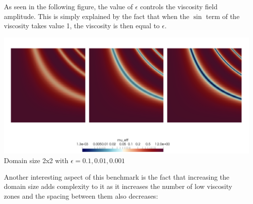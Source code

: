 As seen in the following figure, the value of $\epsilon$ controls the viscosity field amplitude.
This is simply explained by the fact that when the $\sin$ term of the viscosity takes value 1, the viscosity
is then equal to $\epsilon$.
\begin{center}
\includegraphics[width=14cm]{images/mms/mms7_mueffs}\\
Domain size 2x2 with $\epsilon=0.1, 0.01, 0.001$
\end{center}

Another interesting aspect of this benchmark is the fact that increasing the domain size
adds complexity to it as it increases the number of low viscosity zones and the spacing 
between them also decreases:

